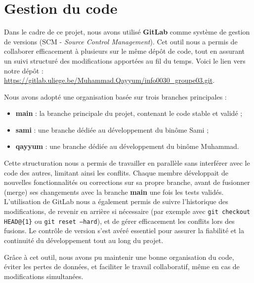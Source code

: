\section{Gestion du code}\label{gestion}

Dans le cadre de ce projet, nous avons utilisé \textbf{GitLab} comme système de 
gestion de versions (SCM - \textit{Source Control Management}). Cet outil nous 
a permis de collaborer efficacement à plusieurs sur le même dépôt de code, 
tout en assurant un suivi structuré des modifications apportées au fil du temps.
Voici le lien vers notre dépôt : \url{https://gitlab.uliege.be/Muhammad.Qayyum/info0030_groupe03.git}.

Nous avons adopté une organisation basée sur trois branches principales :
\begin{itemize}
  \item \textbf{main} : la branche principale du projet, contenant le code stable et validé ;
  \item \textbf{sami} : une branche dédiée au développement du binôme Sami ;
  \item \textbf{qayyum} : une branche dédiée au développement du binôme Muhammad. \\
\end{itemize}

Cette structuration nous a permis de travailler en parallèle sans interférer 
 avec le code des autres, limitant ainsi les conflits. 
 Chaque membre développait de nouvelles fonctionnalités ou corrections 
 sur sa propre branche, avant de fusionner (merge) ses changements avec 
 la branche \textbf{main} une fois les tests validés. \\

L'utilisation de GitLab nous a également permis de suivre l'historique 
des modifications, de revenir en arrière si nécessaire 
(par exemple avec \texttt{git checkout HEAD@\{1\}} ou \texttt{git reset --hard}),
 et de gérer efficacement les conflits lors des fusions. Le contrôle de version 
 s’est avéré essentiel pour assurer la fiabilité et la continuité du 
 développement tout au long du projet.

Grâce à cet outil, nous avons pu maintenir une bonne organisation du code, 
éviter les pertes de données, et faciliter le travail collaboratif, 
même en cas de modifications simultanées.

